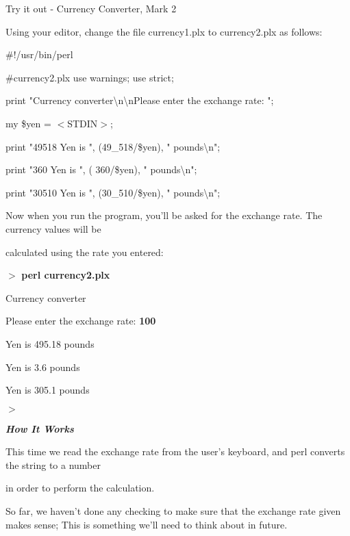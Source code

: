 \documentclass[a4paper,11pt]{book}
\begin{document}
\noindent 

\noindent Try it out - Currency Converter, Mark 2

\noindent 

\noindent Using your editor, change the file currency1.plx to currency2.plx as follows:

\noindent 

\noindent \#!/usr/bin/perl

\noindent \#currency2.plx use warnings; use strict;

\noindent print "Currency converter\textbackslash n\textbackslash nPlease enter the exchange rate: ";

\noindent my \$yen = $<$STDIN$>$;

\noindent print "49518 Yen is ", (49\_518/\$yen), " pounds\textbackslash n";

\noindent print "360 Yen is ", ( 360/\$yen), " pounds\textbackslash n";

\noindent print "30510 Yen is ", (30\_510/\$yen), " pounds\textbackslash n";

\noindent 

\noindent 

\noindent Now when you run the program, you'll be asked for the exchange rate. The currency values will be

\noindent calculated using the rate you entered:

\noindent 

\noindent $>$ \textbf{perl currency2.plx}

\noindent Currency converter

\noindent 

\noindent Please enter the exchange rate: \textbf{100}

 Yen is 495.18 pounds

 Yen is 3.6 pounds

 Yen is 305.1 pounds

\noindent $>$

\noindent 

\noindent \textbf{\textit{How It Works}}

\noindent This time we read the exchange rate from the user's keyboard, and perl converts the string to a number

\noindent in order to perform the calculation.

\noindent 

\noindent So far, we haven't done any checking to make sure that the exchange rate given makes sense; This is something we'll need to think about in future.
\end{document}
